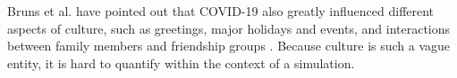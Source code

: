 Bruns et al. have pointed out that COVID-19 also greatly influenced different aspects of culture, such as greetings, major holidays and events, and interactions between family members and friendship groups \citep{bruns_covid-19_2020}. Because culture is such a vague entity, it is hard to quantify within the context of a simulation.